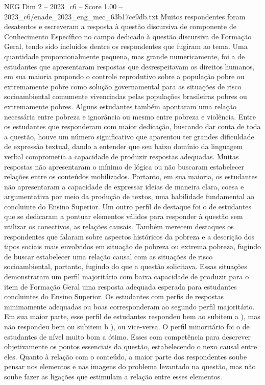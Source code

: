 \begin{textsample}{NEG Dim 2 – 2023\_c6 – Score 1.00 – 2023\_c6/enade\_2023\_eng\_mec\_63b17ce9db.txt}
Muitos respondentes foram desatentos e escreveram a resposta à questão discursiva de componente de Conhecimento Específico no campo dedicado à questão discursiva de Formação Geral, tendo sido incluídos dentre os respondentes que fugiram ao tema.
Uma quantidade proporcionalmente pequena, mas grande numericamente, foi a de estudantes que apresentaram respostas que desrespeitavam os direitos humanos, em sua maioria propondo o controle reprodutivo sobre a população pobre ou extremamente pobre como solução governamental para as situações de risco socioambiental comumente vivenciadas pelas populações brasileiras pobres ou extremamente pobres.
Alguns estudantes também apontaram uma relação necessária entre pobreza e ignorância ou mesmo entre pobreza e violência.
Entre os estudantes que responderam com maior dedicação, buscando dar conta de toda a questão, houve um número significativo que aparentou ter grandes dificuldade de expressão textual, dando a entender que seu baixo domínio da linguagem verbal comprometia a capacidade de produzir respostas adequadas.
Muitas respostas não apresentaram o mínimo de lógica ou não buscaram estabelecer relações entre os conteúdos mobilizados.
Portanto, em sua maioria, os estudantes não apresentaram a capacidade de expressar ideias de maneira clara, coesa e argumentativa por meio da produção de textos, uma habilidade fundamental ao concluinte do Ensino Superior.
Um outro perfil de destaque foi o de estudantes que se dedicaram a pontuar elementos válidos para responder à questão sem utilizar os conectivos, as relações causais.
Também merecem destaques os respondentes que falaram sobre aspectos históricos da pobreza e a descrição dos tipos sociais mais envolvidos em situação de pobreza ou extrema pobreza, fugindo de buscar estabelecer uma relação causal com as situações de risco socioambiental, portanto, fugindo do que a questão solicitava.
Essas situações demonstraram um perfil majoritário com baixa capacidade de produzir para o item de Formação Geral uma resposta adequada esperada para estudantes concluintes do Ensino Superior.
Os estudantes com perfis de respostas minimamente adequadas ou boas corresponderam ao segundo perfil majoritário.
Em sua maior parte, esse perfil de estudantes respondeu bem ao subitem a ), mas não respondeu bem ou subitem b ), ou vice-versa.
O perfil minoritário foi o de estudantes de nível muito bom a ótimo.
Esses com competência para descrever objetivamente os pontos essenciais da questão, estabelecendo o nexo causal entre eles.
Quanto à relação com o conteúdo, a maior parte dos respondentes soube pensar nos elementos e nas imagens do problema levantado na questão, mas não soube fazer as ligações que estimulam a relação entre esses elementos.

\end{textsample}
